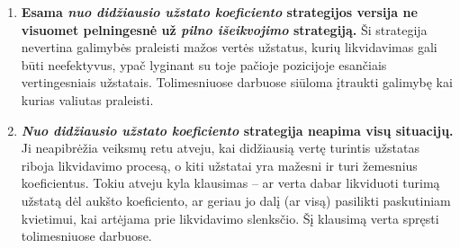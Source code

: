 \documentclass[]{VUMIFTemplateClass}
\begin{document}
\begin{enumerate}
  \item \textbf{Esama \textit{nuo didžiausio užstato koeficiento} strategijos versija ne visuomet pelningesnė už \textit{pilno išeikvojimo} strategiją.} Ši strategija nevertina galimybės praleisti mažos vertės užstatus, kurių likvidavimas gali būti neefektyvus, ypač lyginant su toje pačioje pozicijoje esančiais vertingesniais užstatais. Tolimesniuose darbuose siūloma įtraukti galimybę kai kurias valiutas praleisti.

  \item \textbf{\textit{Nuo didžiausio užstato koeficiento} strategija neapima visų situacijų.} Ji neapibrėžia veiksmų retu atveju, kai didžiausią vertę turintis užstatas riboja likvidavimo procesą, o kiti užstatai yra mažesni ir turi žemesnius koeficientus. Tokiu atveju kyla klausimas – ar verta dabar likviduoti turimą užstatą dėl aukšto koeficiento, ar geriau jo dalį (ar visą) pasilikti paskutiniam kvietimui, kai artėjama prie likvidavimo slenksčio. Šį klausimą verta spręsti tolimesniuose darbuose.
\end{enumerate}



  




\printbibliography[title = {Šaltiniai}]


\end{document}
